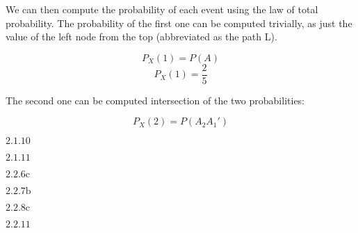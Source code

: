 \documentclass{article}
\newcommand{\problem}[2]{$\boxed{\text{#1.#2}}$}
\begin{document}
We can then compute the probability of each event using the law of
total probability. The probability of the first one can be computed
trivially, as just the value of the left node from the top
(abbreviated as the path L).

\[
P_X(1)=P(A)
\] \[
P_X(1)=\frac{2}{5}
\]

The second one can be computed intersection of the two probabilities:

\[
P_X(2)=P(A_2A_1')
\]

%
\problem{2.1}{10}

%
\problem{2.1}{11}

%
\problem{2.2}{6c}

%
\problem{2.2}{7b}

%
\problem{2.2}{8c}

%
\problem{2.2}{11}
\end{document}
